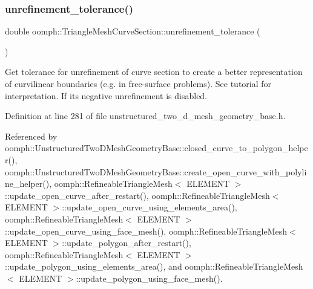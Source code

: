 \subsubsection{\texorpdfstring{unrefinement\+\_\+tolerance()}{unrefinement\_tolerance()}}
{\footnotesize\ttfamily double oomph\+::\+Triangle\+Mesh\+Curve\+Section\+::unrefinement\+\_\+tolerance (\begin{DoxyParamCaption}{ }\end{DoxyParamCaption})\hspace{0.3cm}{\ttfamily [inline]}}



Get tolerance for unrefinement of curve section to create a better representation of curvilinear boundaries (e.\+g. in free-\/surface problems). See tutorial for interpretation. If it\textquotesingle{}s negative unrefinement is disabled. 



Definition at line 281 of file unstructured\+\_\+two\+\_\+d\+\_\+mesh\+\_\+geometry\+\_\+base.\+h.



Referenced by oomph\+::\+Unstructured\+Two\+D\+Mesh\+Geometry\+Base\+::closed\+\_\+curve\+\_\+to\+\_\+polygon\+\_\+helper(), oomph\+::\+Unstructured\+Two\+D\+Mesh\+Geometry\+Base\+::create\+\_\+open\+\_\+curve\+\_\+with\+\_\+polyline\+\_\+helper(), oomph\+::\+Refineable\+Triangle\+Mesh$<$ E\+L\+E\+M\+E\+N\+T $>$\+::update\+\_\+open\+\_\+curve\+\_\+after\+\_\+restart(), oomph\+::\+Refineable\+Triangle\+Mesh$<$ E\+L\+E\+M\+E\+N\+T $>$\+::update\+\_\+open\+\_\+curve\+\_\+using\+\_\+elements\+\_\+area(), oomph\+::\+Refineable\+Triangle\+Mesh$<$ E\+L\+E\+M\+E\+N\+T $>$\+::update\+\_\+open\+\_\+curve\+\_\+using\+\_\+face\+\_\+mesh(), oomph\+::\+Refineable\+Triangle\+Mesh$<$ E\+L\+E\+M\+E\+N\+T $>$\+::update\+\_\+polygon\+\_\+after\+\_\+restart(), oomph\+::\+Refineable\+Triangle\+Mesh$<$ E\+L\+E\+M\+E\+N\+T $>$\+::update\+\_\+polygon\+\_\+using\+\_\+elements\+\_\+area(), and oomph\+::\+Refineable\+Triangle\+Mesh$<$ E\+L\+E\+M\+E\+N\+T $>$\+::update\+\_\+polygon\+\_\+using\+\_\+face\+\_\+mesh().

\mbox{\label{classoomph_1_1TriangleMeshCurveSection_ac44effdfc3a04ba90668e7f3f54b248a}} 
